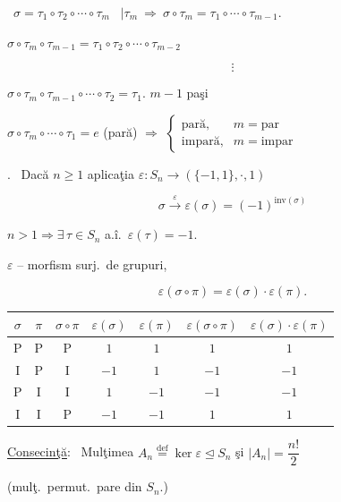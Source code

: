 \documentclass[12pt]{article}
\begin{document}
\noindent{} \ $\sigma=\tau_1\circ\tau_2\circ\cdots\circ\tau_m$ \ $\big|\tau_m \ \Rightarrow \ \sigma\circ\tau_m = \tau_1\circ\cdots\circ\tau_{m-1}.$

\bigskip
\noindent $\sigma\circ\tau_m\circ\tau_{m-1} = \tau_1\circ\tau_2\circ\cdots\circ\tau_{m-2}$

\[
\vdots
\]

\noindent $\sigma\circ\tau_m\circ\tau_{m-1}\circ\cdots\circ\tau_2 = \tau_1$. \quad $m-1$ paşi

\bigskip
\noindent $\sigma\circ\tau_m\circ\cdots\circ\tau_1 = e$ (pară) \quad $\Rightarrow$ \quad
$\begin{cases} \text{pară}, & m=\text{par}\\ \text{impară}, & m=\text{impar} \end{cases}$

\bigskip
\noindent{}. \ Dacă $n\geq 1$ aplicaţia $\varepsilon: S_n \to (\{-1,1\},\cdot,1)$

\[
\sigma \xrightarrow{\ \varepsilon\ } \varepsilon(\sigma) = (-1)^{\text{inv}(\sigma)}
\]

\noindent $n>1 \Rightarrow \exists\,\tau\in S_n$ a.î.\ $\varepsilon(\tau)=-1$.

\bigskip
\noindent $\varepsilon$ -- morfism surj.\ de grupuri,

\[
\varepsilon(\sigma\circ\pi) = \varepsilon(\sigma)\cdot\varepsilon(\pi).
\]

\bigskip
\begin{center}
\begin{tabular}{|c|c|c|c|c|c|c|}
\hline
$\sigma$ & $\pi$ & $\sigma\circ\pi$ & $\varepsilon(\sigma)$ & $\varepsilon(\pi)$ & $\varepsilon(\sigma\circ\pi)$ & $\varepsilon(\sigma)\cdot\varepsilon(\pi)$ \\
\hline
P & P & P & $1$ & $1$ & $1$ & $1$ \\
\hline
I & P & I & $-1$ & $1$ & $-1$ & $-1$ \\
\hline
P & I & I & $1$ & $-1$ & $-1$ & $-1$ \\
\hline
I & I & P & $-1$ & $-1$ & $1$ & $1$ \\
\hline
\end{tabular}
\end{center}

\bigskip
\noindent\underline{Consecinţă}: \ Mulţimea $A_n \overset{\text{def}}{=} \ker\varepsilon \trianglelefteq S_n$ şi $|A_n| = \dfrac{n!}{2}$

\noindent (mulţ.\ permut.\ pare din $S_n$.)
\end{document}
